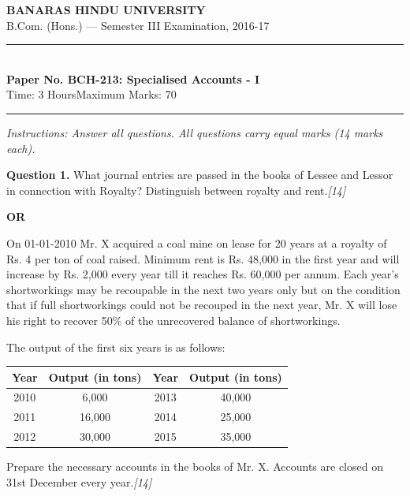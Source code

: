 \documentclass[11pt,a4paper]{article}
\newcommand{\pts}[1]{\hfill   \textit{[#1]}}
\begin{document}
\begin{center}
  {\large\bfseries BANARAS HINDU UNIVERSITY}\\[2pt]
  {\normalsize B.Com. (Hons.) --- Semester III Examination, 2016-17}\\[6pt]
  \rule{0.8\linewidth}{0.5pt}\\[6pt]
  {\large\bfseries Paper No. BCH-213: Specialised Accounts - I}\\[4pt]
  {\normalsize Time: 3 Hours\hfill Maximum Marks: 70}
\end{center}

\rule{\linewidth}{0.4pt}

\smallskip



\noindent   \textit{Instructions: Answer all questions. All questions carry equal marks (14 marks each).}

\bigskip




\noindent   \textbf{Question 1.}
What journal entries are passed in the books of Lessee and Lessor in connection with Royalty? Distinguish between royalty and rent.\pts{14}

\centerline{   \textbf{OR}}

On 01-01-2010 Mr. X acquired a coal mine on lease for 20 years at a royalty of Rs. 4 per ton of coal raised. Minimum rent is Rs. 48,000 in the first year and will increase by Rs. 2,000 every year till it reaches Rs. 60,000 per annum. Each year's shortworkings may be recoupable in the next two years only but on the condition that if full shortworkings could not be recouped in the next year, Mr. X will lose his right to recover 50\% of the unrecovered balance of shortworkings.

The output of the first six years is as follows:

\begin{center}
\small

\begin{tabular}{|c|c||c|c|}
\hline
   \textbf{Year} &   \textbf{Output (in tons)} &   \textbf{Year} &   \textbf{Output (in tons)} \\
\hline
2010 & 6,000  & 2013 & 40,000 \\
2011 & 16,000 & 2014 & 25,000 \\
2012 & 30,000 & 2015 & 35,000 \\
\hline
\end{tabular}
\end{center}

Prepare the necessary accounts in the books of Mr. X. Accounts are closed on 31st December every year.\pts{14}
\end{document}
